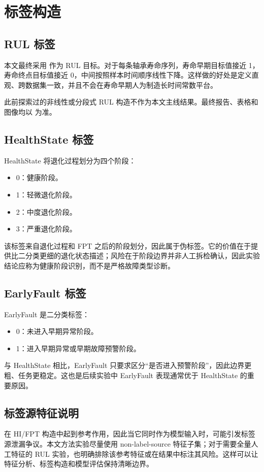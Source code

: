 \section{标签构造}

\subsection{RUL 标签}

本文最终采用  作为 RUL 目标。对于每条轴承寿命序列，寿命早期目标值接近 1，寿命终点目标值接近 0，中间按照样本时间顺序线性下降。这样做的好处是定义直观、跨数据集一致，并且不会在寿命早期人为制造长时间常数平台。

此前探索过的非线性或分段式 RUL 构造不作为本文主线结果。最终报告、表格和图像均以  为准。

\subsection{HealthState 标签}

HealthState 将退化过程划分为四个阶段：

\begin{itemize}
  \item 0：健康阶段。
  \item 1：轻微退化阶段。
  \item 2：中度退化阶段。
  \item 3：严重退化阶段。
\end{itemize}

该标签来自退化过程和 FPT 之后的阶段划分，因此属于伪标签。它的价值在于提供比二分类更细的退化状态描述；风险在于阶段边界并非人工拆检确认，因此实验结论应称为健康阶段识别，而不是严格故障类型诊断。

\subsection{EarlyFault 标签}

EarlyFault 是二分类标签：

\begin{itemize}
  \item 0：未进入早期异常阶段。
  \item 1：进入早期异常或早期故障预警阶段。
\end{itemize}

与 HealthState 相比，EarlyFault 只要求区分“是否进入预警阶段”，因此边界更粗、任务更稳定。这也是后续实验中 EarlyFault 表现通常优于 HealthState 的重要原因。

\subsection{标签源特征说明}

 在 HI/FPT 构造中起到参考作用，因此当它同时作为模型输入时，可能引发标签源泄漏争议。本文方法实验尽量使用 non-label-source 特征子集；对于需要全量人工特征的 RUL 实验，也明确排除该参考特征或在结果中标注其风险。这样可以让特征分析、标签构造和模型评估保持清晰边界。
